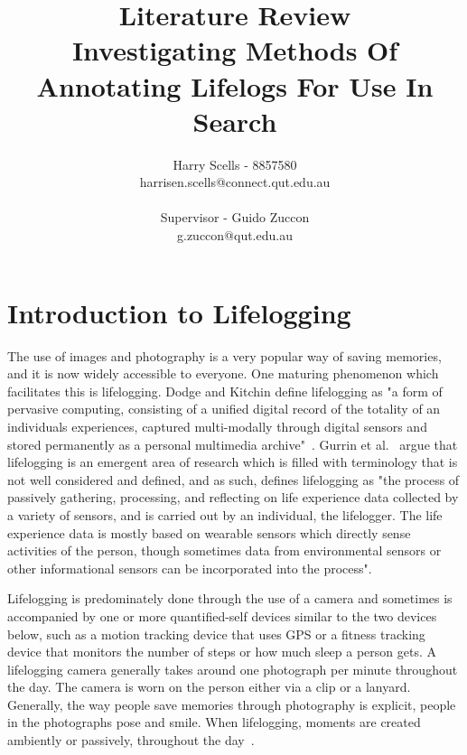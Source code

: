 \documentclass[12pt,a4paper]{article}
\begin{document}
\title{\small Literature Review\\\huge Investigating Methods Of Annotating Lifelogs For Use In Search}

\author{Harry Scells - 8857580\\harrisen.scells@connect.qut.edu.au\\\\\small Supervisor - Guido Zuccon\\\small g.zuccon@qut.edu.au\\}
\maketitle
\pagebreak
\tableofcontents
\pagebreak
\section{Introduction to Lifelogging}
The use of images and photography is a very popular way of saving memories, and it is now widely accessible to everyone. One maturing phenomenon which facilitates this is lifelogging. Dodge and Kitchin define lifelogging as "a form of pervasive computing, consisting of a unified digital record of the totality of an individuals experiences, captured multi-modally through digital sensors and stored permanently as a personal multimedia archive"~\cite{dodge2007outlines}. Gurrin et al.~\cite{gurrin2014lifelogging} argue that lifelogging is an emergent area of research which is filled with terminology that is not well considered and defined, and as such, defines lifelogging as "the process of passively gathering, processing, and reflecting on life experience data collected by a variety of sensors, and is carried out by an individual, the lifelogger. The life experience data is mostly based on wearable sensors which directly sense activities of the person, though sometimes data from environmental sensors or other informational sensors can be incorporated into the process".

 Lifelogging is predominately done through the use of a camera and sometimes is accompanied by one or more quantified-self devices similar to the two devices below, such as a motion tracking device that uses GPS or a fitness tracking device that monitors the number of steps or how much sleep a person gets. A lifelogging camera generally takes around one photograph per minute throughout the day. The camera is worn on the person either via a clip or a lanyard. Generally, the way people save memories through photography is explicit, people in the photographs pose and smile. When lifelogging, moments are created ambiently or passively, throughout the day~\cite{gurrin2014lifelogging}.
\end{document}
